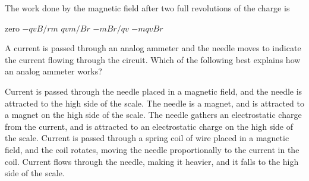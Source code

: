 \documentclass{../../../oss-apphys-exam}
\begin{document}
\begin{multicols*}{2}
\begin{questions}
    \question The work done by the magnetic field after two full revolutions of
    the charge is
    \begin{choices}
      \choice zero
      \choice $-qvB/rm$
      \choice $qvm/Br$
      \choice $-mBr/qv$
      \choice $-mqvBr$
    \end{choices}
    \label{q:circ2}
    \columnbreak
    

    \question A current is passed through an analog ammeter and the needle moves
    to indicate the current flowing through the circuit. Which of the
    following best explains how an analog ammeter works?
    \begin{choices}
      \choice Current is passed through the needle placed in a magnetic field,
      and the needle is attracted to the high side of the scale.
      \choice The needle is a magnet, and is attracted to a magnet on the high
      side of the scale.
      \choice The needle gathers an electrostatic charge from the current, and
      is attracted to an electrostatic charge on the high side of the scale.
      \choice Current is passed through a spring coil of wire placed in a
      magnetic field, and the coil rotates, moving the needle
      proportionally to the current in the coil.
      \choice Current flows through the needle, making it heavier, and it falls
      to the high side of the scale.
    \end{choices}
    

\end{questions}
\end{multicols*}
\end{document}
